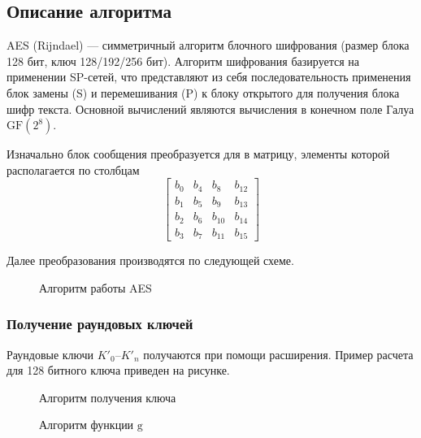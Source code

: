 
\vspace{-1\baselineskip}

\subsection{Описание алгоритма}

AES (Rijndael) ---  симметричный алгоритм блочного шифрования (размер блока 128
бит, ключ 128/192/256 бит). Алгоритм шифрования базируется на применении
SP-сетей, что представляют из себя последовательность применения блок
замены (S) и перемешивания (P) к блоку открытого для получения блока шифр
текста. Основной вычислений являются вычисления в конечном поле Галуа
$\mathrm{GF}(2^8)$.

Изначально блок сообщения преобразуется для в матрицу, элементы которой
располагается по столбцам
\begin{equation*}
    \begin{bmatrix}
        b_0 & b_4 & b_8  & b_{12} \\
        b_1 & b_5 & b_9  & b_{13} \\
        b_2 & b_6 & b_{10} & b_{14} \\
        b_3 & b_7 & b_{11} & b_{15}
    \end{bmatrix}
\end{equation*}

Далее преобразования производятся по следующей схеме.

\begin{figure}[h]
    \centering
    \def\svgwidth{0.45\textwidth}
    
    \caption{Алгоритм работы AES}
\end{figure}

\clearpage

\subsubsection{Получение раундовых ключей}

Раундовые ключи $K'_0$--$K'_n$ получаются при помощи расширения. Пример
расчета для 128 битного ключа приведен на рисунке.

\begin{figure}[h]
    \centering
    \def\svgwidth{0.6\textwidth}
    
    \caption{Алгоритм получения ключа}
\end{figure}

\begin{figure}[h]
    \centering
    \def\svgwidth{0.6\textwidth}
    
    \caption{Алгоритм функции $\mathrm{g}$}
\end{figure}

